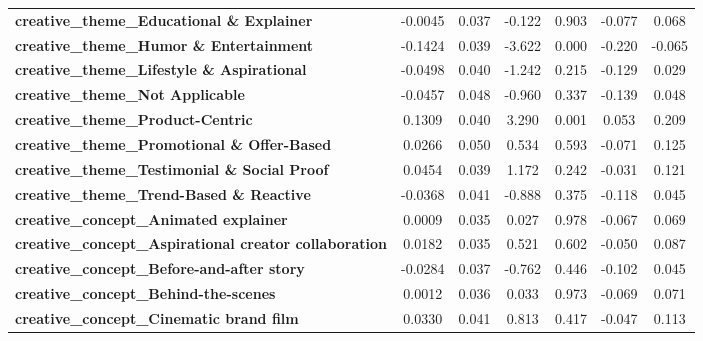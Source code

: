 \begin{center}
\begin{tabular}{lcccccc}
\textbf{creative\_theme\_Educational \& Explainer}              &      -0.0045  &        0.037     &    -0.122  &         0.903        &       -0.077    &        0.068     \\
\textbf{creative\_theme\_Humor \& Entertainment}                &      -0.1424  &        0.039     &    -3.622  &         0.000        &       -0.220    &       -0.065     \\
\textbf{creative\_theme\_Lifestyle \& Aspirational}             &      -0.0498  &        0.040     &    -1.242  &         0.215        &       -0.129    &        0.029     \\
\textbf{creative\_theme\_Not Applicable}                        &      -0.0457  &        0.048     &    -0.960  &         0.337        &       -0.139    &        0.048     \\
\textbf{creative\_theme\_Product-Centric}                       &       0.1309  &        0.040     &     3.290  &         0.001        &        0.053    &        0.209     \\
\textbf{creative\_theme\_Promotional \& Offer-Based}            &       0.0266  &        0.050     &     0.534  &         0.593        &       -0.071    &        0.125     \\
\textbf{creative\_theme\_Testimonial \& Social Proof}           &       0.0454  &        0.039     &     1.172  &         0.242        &       -0.031    &        0.121     \\
\textbf{creative\_theme\_Trend-Based \& Reactive}               &      -0.0368  &        0.041     &    -0.888  &         0.375        &       -0.118    &        0.045     \\
\textbf{creative\_concept\_Animated explainer}                  &       0.0009  &        0.035     &     0.027  &         0.978        &       -0.067    &        0.069     \\
\textbf{creative\_concept\_Aspirational creator collaboration}  &       0.0182  &        0.035     &     0.521  &         0.602        &       -0.050    &        0.087     \\
\textbf{creative\_concept\_Before-and-after story}              &      -0.0284  &        0.037     &    -0.762  &         0.446        &       -0.102    &        0.045     \\
\textbf{creative\_concept\_Behind-the-scenes}                   &       0.0012  &        0.036     &     0.033  &         0.973        &       -0.069    &        0.071     \\
\textbf{creative\_concept\_Cinematic brand film}                &       0.0330  &        0.041     &     0.813  &         0.417        &       -0.047    &        0.113     \\

\end{tabular}
\end{center}
